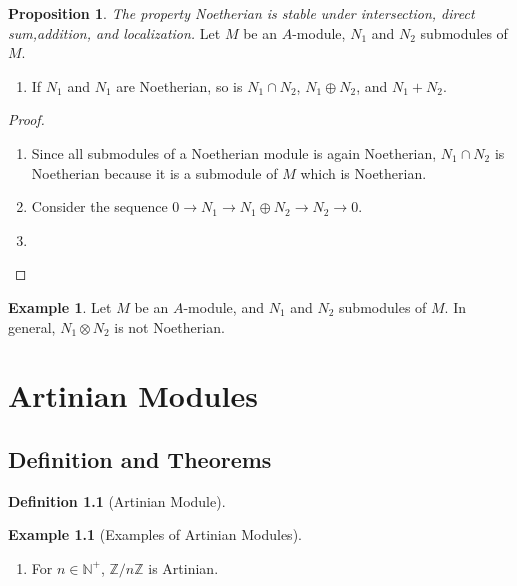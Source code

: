\documentclass[a4paper]{book}
\theoremstyle{definition}
\newtheorem{definition}{Definition}[]
\newtheorem{example}{Example}[definition]
\newtheorem{proposition}[definition]{Proposition}
\begin{document}
\begin{thmbox}
    \begin{proposition}
        \textit{The property Noetherian is stable under intersection, direct sum,addition, and localization.} Let \(M\) be an \(A\)-module, \(N_1\) and \(N_2\) submodules of \(M\).
        \begin{enumerate}
            \item If \(N_1\) and \(N_1\) are Noetherian, so is \(N_1 \cap N_2\), \(N_1 \oplus N_2\), and \(N_1 + N_2\).
        \end{enumerate}
    \end{proposition}
\end{thmbox}
\begin{proof}
    \begin{enumerate}
        \item Since all submodules of a Noetherian module is again Noetherian, \(N_1 \cap N_2\) is Noetherian because it is a submodule of \(M\) which is Noetherian.
        \item Consider the sequence \(0 \rightarrow N_1 \rightarrow N_1 \oplus N_2 \rightarrow N_2 \rightarrow 0\).
        \item 
    \end{enumerate}
\end{proof}

\begin{exmbox}
    \begin{example}
        Let \(M\) be an \(A\)-module, and \(N_1\) and \(N_2\) submodules of \(M\). In general, \(N_1 \otimes N_2\) is not Noetherian.
    \end{example}
\end{exmbox}

\chapter{Artinian Modules}
\section{Definition and Theorems}
\begin{defbox}
    \begin{definition}[Artinian Module]
        
    \end{definition}
\end{defbox}


\begin{example}[Examples of Artinian Modules]
    \begin{enumerate}
        \item For \(n \in \mathbb{N}^+\), \(\mathbb{Z} / n \mathbb{Z}\) is Artinian.
    \end{enumerate}
\end{example}
\end{document}
